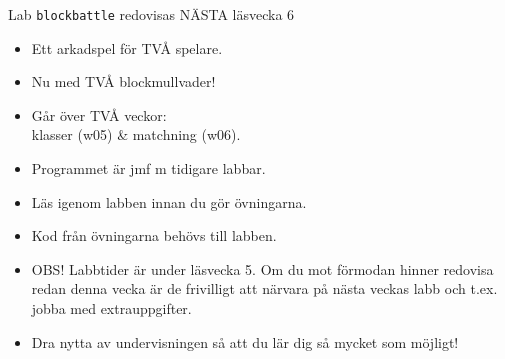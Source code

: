 \begin{SlideExtra}{Lab \texttt{blockbattle} redovisas NÄSTA läsvecka 6}
\begin{minipage}{0.59\textwidth}
    \begin{itemize}\SlideFontTiny
      \item Ett arkadspel för TVÅ spelare.
      \item Nu med TVÅ blockmullvader!
      \item Går över TVÅ veckor:\\klasser (w05) \& matchning (w06).
      \item Programmet  är  jmf m tidigare labbar.
      \item Läs igenom labben innan du gör övningarna.
      \item Kod från övningarna behövs till labben. 
      \item OBS! Labbtider är  under läsvecka 5. Om du mot förmodan hinner redovisa redan denna vecka är de frivilligt att närvara på nästa veckas labb och t.ex. jobba med extrauppgifter. 
      \item Dra nytta av undervisningen så att du lär dig så mycket som möjligt!  
    \end{itemize}    
  \end{minipage}
\end{SlideExtra}
  
\fi

